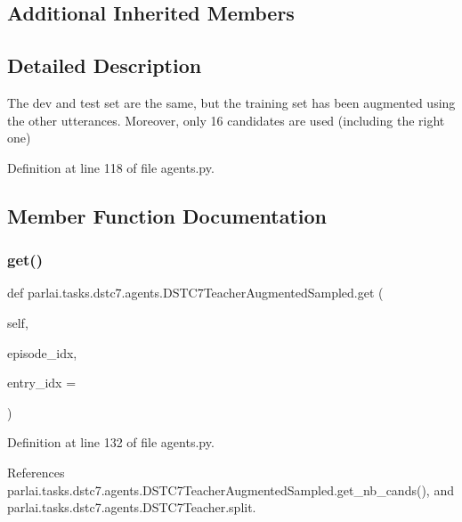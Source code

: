 \subsection*{Additional Inherited Members}


\subsection{Detailed Description}
\begin{DoxyVerb}The dev and test set are the same, but the training set has been
    augmented using the other utterances.
    Moreover, only 16 candidates are used (including the right one)
\end{DoxyVerb}
 

Definition at line 118 of file agents.\+py.



\subsection{Member Function Documentation}
\mbox{\label{classparlai_1_1tasks_1_1dstc7_1_1agents_1_1DSTC7TeacherAugmentedSampled_a0df2da11ff943988cb4eb01dab6354c8}} 
\subsubsection{\texorpdfstring{get()}{get()}}
{\footnotesize\ttfamily def parlai.\+tasks.\+dstc7.\+agents.\+D\+S\+T\+C7\+Teacher\+Augmented\+Sampled.\+get (\begin{DoxyParamCaption}\item[{}]{self,  }\item[{}]{episode\+\_\+idx,  }\item[{}]{entry\+\_\+idx = {} }\end{DoxyParamCaption})}



Definition at line 132 of file agents.\+py.



References parlai.\+tasks.\+dstc7.\+agents.\+D\+S\+T\+C7\+Teacher\+Augmented\+Sampled.\+get\+\_\+nb\+\_\+cands(), and parlai.\+tasks.\+dstc7.\+agents.\+D\+S\+T\+C7\+Teacher.\+split.



